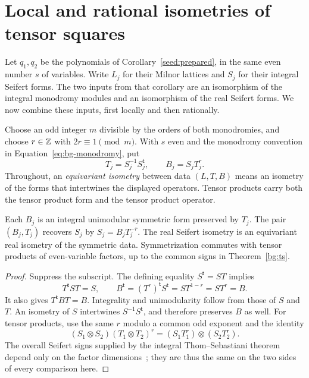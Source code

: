 \section{Local and rational isometries of tensor squares}
\label{local:section}

Let $q_1,q_2$ be the polynomials of Corollary~\ref{seed:prepared},
in the same even number $s$ of variables.  Write $L_j$ for their Milnor
lattices and $S_j$ for their integral Seifert forms.  The two inputs from
that corollary are an isomorphism of the integral monodromy modules
and an isomorphism of the real Seifert forms.  We now combine these
inputs, first locally and then rationally.

Choose an odd integer $m$ divisible by the orders of both monodromies,
and choose $r\in\mathbb Z$ with $2r\equiv1\pmod m$.  With $s$ even and the
monodromy convention in Equation~\eqref{eq:bg-monodromy}, put
\begin{equation}\label{local:symmetric-data}
 T_j=S_j^{-1}S_j^{\mathsf t},\qquad B_j=S_jT_j^r.
\end{equation}
Throughout, an \emph{equivariant isometry} between data $(L,T,B)$
means an isometry of the forms that intertwines the displayed operators.
Tensor products carry both the tensor product form and the tensor product
operator.

\begin{lemma}[Symmetrization]\label{local:symmetrize}
Each $B_j$ is an integral unimodular symmetric form preserved by $T_j$.
The pair $(B_j,T_j)$ recovers $S_j$ by $S_j=B_jT_j^{-r}$.
The real Seifert isometry is an equivariant real isometry of the
symmetric data.  Symmetrization commutes with tensor products of
even-variable factors, up to the common signs in
Theorem~\ref{bg:ts}.
\end{lemma}

\begin{proof}
Suppress the subscript.  The defining equality $S^{\mathsf t}=ST$ implies
\[
 T^{\mathsf t}ST=S,\qquad
 B^{\mathsf t}=(T^r)^{\mathsf t}S^{\mathsf t}
             =ST^{1-r}=ST^r=B.
\]
It also gives $T^{\mathsf t}BT=B$.  Integrality and unimodularity follow
from those of $S$ and $T$.  An isometry of $S$ intertwines
$S^{-1}S^{\mathsf t}$, and therefore preserves $B$ as well.
For tensor products, use the same $r$ modulo a common odd exponent and
the identity
\[
 (S_1\otimes S_2)(T_1\otimes T_2)^r
       =(S_1T_1^r)\otimes(S_2T_2^r).
\]
The overall Seifert signs supplied by the integral Thom--Sebastiani
theorem depend only on the factor dimensions~\cite{Sakamoto1974};
they are thus the same on the two sides of every comparison here.
\end{proof}

